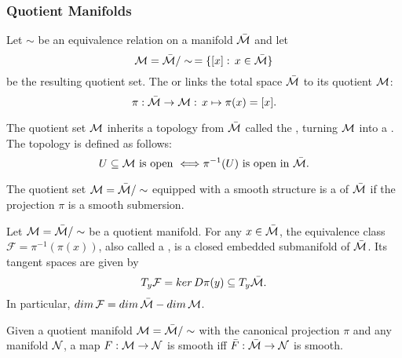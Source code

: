 \documentclass[11pt,a4paper]{article}
\begin{document}
\subsubsection{Quotient Manifolds}

Let $\sim$ be an equivalence relation on a manifold $\bar{\mathcal{M}}$ and let 
\begin{equation*}
\mathcal{M} = \bar{\mathcal{M}}/\sim \,= \{[x]:\,x\in \bar{\mathcal{M}}\}
\end{equation*}
be the resulting quotient set. The  or  links the total space $\bar{\mathcal{M}}$ to its quotient $\mathcal{M}$:
\begin{equation*}
    \pi:\bar{\mathcal{M}}\rightarrow \mathcal{M}:\,x\mapsto \pi(x) = [x].
\end{equation*}

\begin{definition}
The quotient set $\mathcal{M}$ inherits a topology from $\bar{\mathcal{M}}$ called the , turning $\mathcal{M}$ into a . The topology is defined as follows:
\begin{equation*}
U\subseteq \mathcal{M} \text{ is open } \Longleftrightarrow \pi^{-1}(U)\text{ is open in }\bar{\mathcal{M}}.
\end{equation*}
\end{definition}

\begin{definition}
The quotient set $\mathcal{M} = \bar{\mathcal{M}}/\sim$ equipped with a smooth structure is a  of $\bar{\mathcal{M}}$ if the projection $\pi$ is a smooth submersion.
\end{definition}

\begin{proposition}
Let $\mathcal{M} = \bar{\mathcal{M}}/\sim$ be a quotient manifold. For any $x\in \bar{\mathcal{M}}$, the equivalence class $\mathcal{F} = \pi^{-1}(\pi(x))$, also called a , is a closed embedded submanifold of $\bar{\mathcal{M}}$. Its tangent spaces are given by
\begin{equation*}
T_y\mathcal{F} = ker\,D\pi(y)\subseteq T_y\bar{\mathcal{M}}.
\end{equation*}
In particular, $dim\,\mathcal{F} = dim\,\bar{\mathcal{M}}-dim\,\mathcal{M}$.
\end{proposition}

\begin{proposition}
Given a quotient manifold $\mathcal{M} = \bar{\mathcal{M}}/\sim$ with the canonical projection $\pi$ and any manifold $\mathcal{N}$, a map $F:\mathcal{M}\rightarrow \mathcal{N}$ is smooth iff $\bar{F}:\bar{\mathcal{M}}\rightarrow \mathcal{N}$ is smooth.
\end{proposition}
\end{document}
